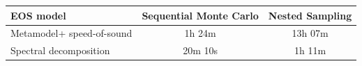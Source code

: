 \renewcommand{\arraystretch}{1.4}
\begin{tabular}{p{4.5cm}cc}
    \hline
    EOS model & Sequential Monte Carlo & Nested Sampling \\
    \hline
    Metamodel\newline + speed-of-sound & 1h 24m & 13h 07m \\
    Spectral decomposition & 20m 10s & 1h 11m \\
    \hline
\end{tabular}
